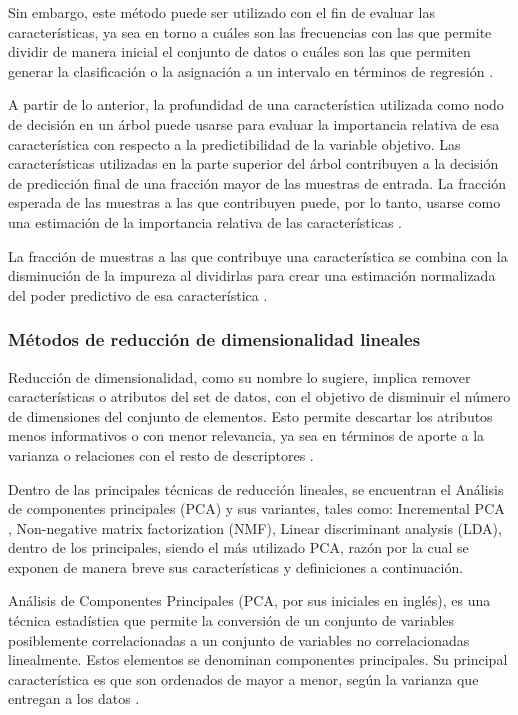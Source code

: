 Sin embargo, este método puede ser utilizado con el fin de evaluar las características, ya sea en torno a cuáles son las frecuencias con las que permite dividir de manera inicial el conjunto de datos o cuáles son las que permiten generar la clasificación o la asignación a un intervalo en términos de regresión \cite{saeys2008robust}. 

A partir de lo anterior, la profundidad de una característica utilizada como nodo de decisión en un árbol puede usarse para evaluar la importancia relativa de esa característica con respecto a la predictibilidad de la variable objetivo. Las características utilizadas en la parte superior del árbol contribuyen a la decisión de predicción final de una fracción mayor de las muestras de entrada. La fracción esperada de las muestras a las que contribuyen puede, por lo tanto, usarse como una estimación de la importancia relativa de las características \cite{granitto2006recursive}. 

La fracción de muestras a las que contribuye una característica se combina con la disminución de la impureza al dividirlas para crear una estimación normalizada del poder predictivo de esa característica \cite{saeys2008robust}.

\subsubsection{Métodos de reducción de dimensionalidad lineales}

Reducción de dimensionalidad, como su nombre lo sugiere, implica remover características o atributos del set de datos, con el objetivo de disminuir el número de dimensiones del conjunto de elementos. Esto permite descartar los atributos menos informativos o con menor relevancia, ya sea en términos de aporte a la varianza o relaciones con el resto de descriptores \cite{hinton2006reducing}.

Dentro de las principales técnicas de reducción lineales, se encuentran el Análisis de componentes principales (PCA) y sus variantes, tales como: Incremental PCA \cite{jolliffe2011principal}, Non-negative matrix factorization (NMF), Linear discriminant analysis (LDA), dentro de los principales, siendo el más utilizado PCA, razón por la cual se exponen de manera breve sus características y definiciones a continuación. 

Análisis de Componentes Principales (PCA, por sus iniciales en inglés), es una técnica estadística que permite la conversión de un conjunto de variables posiblemente correlacionadas a un conjunto de variables no correlacionadas linealmente. Estos elementos se denominan componentes principales. Su principal característica es que son ordenados de mayor a menor, según la varianza que entregan a los datos \cite{jolliffe2011principal}.

